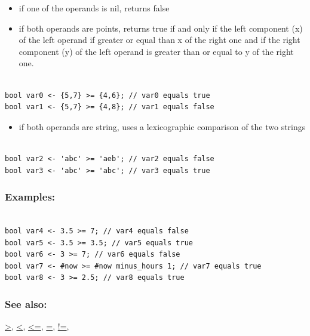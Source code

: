 \documentclass[]{book}
\providecommand{\tightlist}{%
  \setlength{\itemsep}{0pt}\setlength{\parskip}{0pt}}
\theoremstyle{definition}
\theoremstyle{definition}
\theoremstyle{definition}
\theoremstyle{remark}
\begin{document}
\begin{itemize}
\tightlist
\item
  if one of the operands is nil, returns false\\
\item
  if both operands are points, returns true if and only if the left
  component (x) of the left operand if greater or equal than x of the
  right one and if the right component (y) of the left operand is
  greater than or equal to y of the right one.
\end{itemize}

\begin{verbatim}
 
bool var0 <- {5,7} >= {4,6}; // var0 equals true 
bool var1 <- {5,7} >= {4,8}; // var1 equals false
\end{verbatim}

\begin{itemize}
\tightlist
\item
  if both operands are string, uses a lexicographic comparison of the
  two strings
\end{itemize}

\begin{verbatim}
 
bool var2 <- 'abc' >= 'aeb'; // var2 equals false 
bool var3 <- 'abc' >= 'abc'; // var3 equals true
\end{verbatim}

\subsubsection{Examples:}\label{examples-11}

\begin{verbatim}
 
bool var4 <- 3.5 >= 7; // var4 equals false 
bool var5 <- 3.5 >= 3.5; // var5 equals true 
bool var6 <- 3 >= 7; // var6 equals false 
bool var7 <- #now >= #now minus_hours 1; // var7 equals true 
bool var8 <- 3 >= 2.5; // var8 equals true
\end{verbatim}

\subsubsection{See also:}\label{see-also-13}

\href{operators-a-to-a.html\#\%3E}{\textgreater{}},
\href{operators-a-to-a.html\#\%3C}{\textless{}},
\href{operators-a-to-a.html\#\%3C=}{\textless{}=},
\href{operators-a-to-a.html\#=}{=},
\href{operators-a-to-a.html\#!=}{!=},
\end{document}
